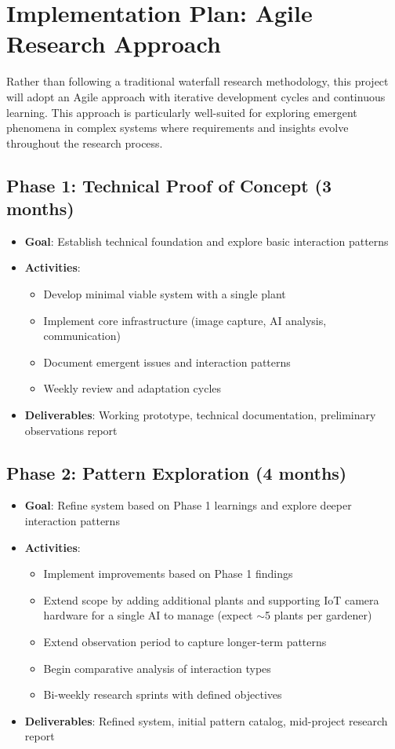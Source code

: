 \documentclass[12pt,letterpaper]{article}
\begin{document}
\section{Implementation Plan: Agile Research Approach}

Rather than following a traditional waterfall research methodology, this project will adopt an Agile approach with iterative development cycles and continuous learning. This approach is particularly well-suited for exploring emergent phenomena in complex systems where requirements and insights evolve throughout the research process.

\subsection{Phase 1: Technical Proof of Concept (3 months)}
\begin{itemize}
    \item \textbf{Goal}: Establish technical foundation and explore basic interaction patterns
    \item \textbf{Activities}:
    \begin{itemize}
        \item Develop minimal viable system with a single plant
        \item Implement core infrastructure (image capture, AI analysis, communication)
        \item Document emergent issues and interaction patterns
        \item Weekly review and adaptation cycles
    \end{itemize}
    \item \textbf{Deliverables}: Working prototype, technical documentation, preliminary observations report
\end{itemize}

\subsection{Phase 2: Pattern Exploration (4 months)}
\begin{itemize}
    \item \textbf{Goal}: Refine system based on Phase 1 learnings and explore deeper interaction patterns
    \item \textbf{Activities}:
    \begin{itemize}
        \item Implement improvements based on Phase 1 findings
        \item Extend scope by adding additional plants and supporting IoT camera hardware for a single AI to manage (expect $\sim$5 plants per gardener)
        \item Extend observation period to capture longer-term patterns
        \item Begin comparative analysis of interaction types
        \item Bi-weekly research sprints with defined objectives
    \end{itemize}
    \item \textbf{Deliverables}: Refined system, initial pattern catalog, mid-project research report
\end{itemize}
\end{document}
